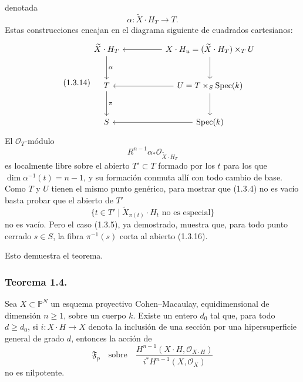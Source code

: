 \pageoriginale

denotada
\begin{equation}\tag{1.3.13}
\alpha:\widetilde X\mathbin{\cdot}H_T\longrightarrow T.
\end{equation}
Estas construcciones encajan en el diagrama siguiente de cuadrados
cartesianos:
\begin{equation}\tag{1.3.14}
\begin{tikzcd}[column sep=huge,row sep=large]
\widetilde X\mathbin{\cdot}H_T \arrow[d,"\alpha"]
& X\mathbin{\cdot}H_u=
 \sisi{(\widetilde X\mathbin{\cdot}H_T)\times_U T}
       {(\widetilde X\mathbin{\cdot}H_T)\times_T U}
 \arrow[l]\arrow[d] \\
T \arrow[d,"\pi"]
& U=T\times_S\operatorname{Spec}(k) \arrow[l]\arrow[d] \\
S & \operatorname{Spec}(k)\arrow[l]
\end{tikzcd}
\end{equation}
El $\mathcal O_T$-módulo
\begin{equation}\tag{1.3.15}
R^{n-1}\alpha_*\mathcal O_{\widetilde X\cdot H_T}
\end{equation}
es localmente libre sobre el abierto $T'\subset T$ formado por los $t$
para los que $\dim\alpha^{-1}(t)=n-1$, y su formación conmuta allí con
todo cambio de base. Como $T$ y $U$ tienen el mismo punto genérico, para
mostrar que (1.3.4) no es vacío basta probar que el abierto de $T'$
\begin{equation}\tag{1.3.16}
\bigl\{t\in T'\mid\widetilde X_{\pi(t)}\mathbin{\cdot}H_t
\text{ no es especial}\bigr\}
\end{equation}
no es vacío. Pero el caso (1.3.5), ya demostrado, muestra que, para todo
punto cerrado $s\in S$, la fibra $\pi^{-1}(s)$ corta al abierto (1.3.16).

\pageoriginale

Esto demuestra el teorema.

\subsubsection*{Teorema 1.4.}
Sea $X\subset\mathbb P^N$ un esquema proyectivo Cohen--Macaulay,
equidimensional de dimensión $n\geq1$, sobre un cuerpo $k$. Existe un
entero $d_0$ tal que, para todo $d\geq d_0$, si
$i:X\mathbin{\cdot}H\longrightarrow X$ denota la inclusión de una sección
por una hipersuperficie general de grado $d$, entonces la acción de
\begin{equation}\tag{1.4.0}
\mathfrak F_p\quad\text{sobre}\quad
\frac{H^{n-1}(X\mathbin{\cdot}H,\mathcal O_{X\cdot H})}
{i^*H^{n-1}(X,\mathcal O_X)}
\end{equation}
no es nilpotente.

